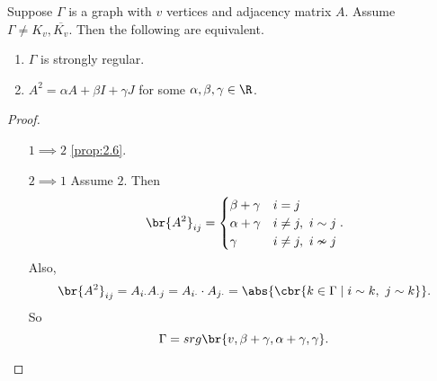 \begin{proposition}
\label{prop:3.19}
Suppose $ \Gamma $ is a graph with $ v $ vertices and adjacency matrix $ A $. Assume $ \Gamma \ne K_v, \overline{K_v} $. Then the following are equivalent.
\begin{enumerate}
\item $ \Gamma $ is strongly regular.
\item $ A^2 = \alpha A + \beta I + \gamma J $ for some $ \alpha, \beta, \gamma \in \R $.
\end{enumerate}
\end{proposition}

\begin{proof}
\hfill
\begin{itemize}[leftmargin=0.5in]
\item[$ 1 \implies 2 $] \ref{prop:2.6}.
\item[$ 2 \implies 1 $] Assume $ 2 $. Then
$$ \br{A^2}_{ij} =
\begin{cases}
\beta + \gamma & i = j \\
\alpha + \gamma & i \ne j, \ i \sim j \\
\gamma & i \ne j, \ i \nsim j
\end{cases}.
$$
Also,
$$ \br{A^2}_{ij} = A_{i\cdot}A_{\cdot j} = A_{i \cdot} \cdot A_{j\cdot} = \abs{\cbr{k \in \Gamma \mid i \sim k, \ j \sim k}}. $$
So
$$ \Gamma = srg\br{v, \beta + \gamma, \alpha + \gamma, \gamma}. $$
\end{itemize}
\end{proof}

\pagebreak

